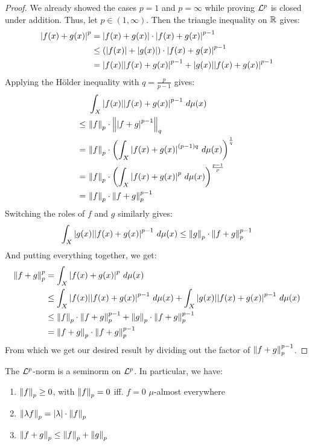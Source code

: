 \begin{proof}
	We already showed the cases $p = 1$ and $p = \infty$
	while proving $\mathcal{L}^p$ is closed under addition.
	Thus, let $p \in (1, \infty)$.
	Then the triangle inequality on $\mathbb{R}$ gives:
	\begin{align*}
		\abs{f(x) + g(x)}^p 
		&=
		\abs{f(x) + g(x)} \cdot \abs{f(x) + g(x)}^{p-1}\\
		&\leq (\abs{f(x)} + \abs{g(x)}) \cdot \abs{f(x) + g(x)}^{p-1}\\
		&=
		\abs{f(x)}\abs{f(x) + g(x)}^{p-1}
		+
		\abs{g(x)}\abs{f(x) + g(x)}^{p-1}
	\end{align*}
	Applying the Hölder inequality with $q = \frac{p}{p-1}$ gives:
	\begin{align*}
		&~\int_X \abs{f(x)}\abs{f(x) + g(x)}^{p-1} ~d\mu(x)\\
		\leq
		&~\norm{f}_p \cdot \norm{\abs{f + g}^{p-1}}_q\\
		=
		&~\norm{f}_p \cdot \qty(\int_X \abs{f(x) + g(x)}^{(p-1)q} ~d\mu(x))^\frac{1}{q}\\
		=
		&~\norm{f}_p \cdot \qty(\int_X \abs{f(x) + g(x)}^{p} ~d\mu(x))^\frac{p-1}{p}\\
		=
		&~\norm{f}_p \cdot \norm{f+g}_p^{p-1}
	\end{align*}
	Switching the roles of $f$ and $g$ similarly gives:
	\begin{align*}
		\int_X \abs{g(x)}\abs{f(x) + g(x)}^{p-1} ~d\mu(x)
		\leq \norm{g}_p \cdot \norm{f+g}_p^{p-1}
	\end{align*}
	And putting everything together, we get:
	\begin{align*}
		\norm{f + g}_p^p 
		&= \int_X \abs{f(x) + g(x)}^p ~d\mu(x)\\
		&\leq 
		\int_X \abs{f(x)}\abs{f(x) + g(x)}^{p-1} ~d\mu(x)
		+
		\int_X \abs{g(x)}\abs{f(x) + g(x)}^{p-1} ~d\mu(x)\\
		&\leq
		\norm{f}_p \cdot \norm{f+g}_p^{p-1}
		+
		\norm{g}_p \cdot \norm{f+g}_p^{p-1}\\
		&=
		\norm{f + g}_p \cdot \norm{f+g}_p^{p-1}
	\end{align*}
	From which we get our desired result by dividing out the factor of $\norm{f+g}_p^{p-1}$.
\end{proof}
\begin{importantcorollary}{}{}
	The $\mathcal{L}^p$-norm is a seminorm on $\mathcal{L}^p$. In particular, we have:
	\begin{enumerate}
		\item $\norm{f}_p \geq 0$, with $\norm{f}_p = 0$ iff. $f = 0$ $\mu$-almost everywhere
		\item $\norm{\lambda f}_p = \abs{\lambda} \cdot \norm{f}_p$
		\item $\norm{f + g}_p \leq \norm{f}_p + \norm{g}_p$
	\end{enumerate}
\end{importantcorollary}
